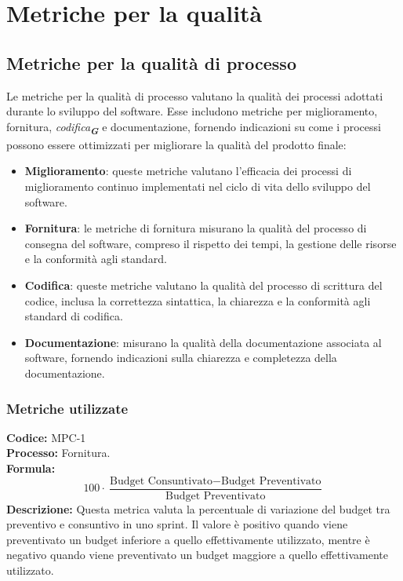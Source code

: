
\appendix %

\section{Metriche per la qualità}
\label{sec:metriche_qualita}

\subsection{Metriche per la qualità di processo}
Le metriche per la qualità di processo valutano la qualità dei processi adottati durante 
lo sviluppo del software. Esse includono metriche per miglioramento, fornitura, 
\emph{codifica}\textsubscript{\textit{\textbf{G}}} e documentazione, fornendo indicazioni su come i processi 
possono essere ottimizzati per migliorare la qualità del prodotto finale:
\begin{itemize}
    \item \textbf{Miglioramento}: queste metriche valutano l’efficacia dei processi di miglioramento continuo implementati
    nel ciclo di vita dello sviluppo del software.
    \item \textbf{Fornitura}: le metriche di fornitura misurano la qualità del processo di consegna del software, compreso 
    il rispetto dei tempi, la gestione delle risorse e la conformità agli standard.
    \item \textbf{Codifica}: queste metriche valutano la qualità del processo di scrittura del codice, inclusa la correttezza 
    sintattica, la chiarezza e la conformità agli standard di codifica.
    \item \textbf{Documentazione}: misurano la qualità della documentazione associata al software, fornendo indicazioni sulla
    chiarezza e completezza della documentazione.
\end{itemize}

\subsubsection{Metriche utilizzate}
\textbf{Codice:} MPC-1 \\
\textbf{Processo:} Fornitura. \\
\textbf{Formula:}
\[
100 \cdot \frac{\text{Budget Consuntivato} - \text{Budget Preventivato}}{\text{Budget Preventivato}}
\]
\textbf{Descrizione:} Questa metrica valuta la percentuale di variazione del budget tra preventivo e consuntivo in uno sprint. Il valore è positivo quando viene preventivato un budget inferiore a quello effettivamente utilizzato, mentre è negativo quando viene preventivato un budget maggiore a quello effettivamente utilizzato.

